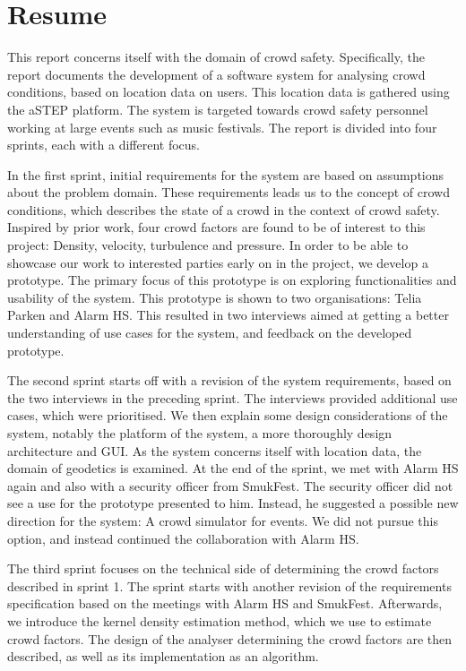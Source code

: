 \chapter*{Resume}

This report concerns itself with the domain of crowd safety. Specifically, the report documents the development of a software system for analysing crowd conditions, based on location data on users. This location data is gathered using the aSTEP platform. The system is targeted towards crowd safety personnel working at large events such as music festivals. The report is divided into four sprints, each with a different focus.

In the first sprint, initial requirements for the system are based on assumptions about the problem domain. These requirements leads us to the concept of crowd conditions, which describes the state of a crowd in the context of crowd safety. Inspired by prior work, four crowd factors are found to be of interest to this project: Density, velocity, turbulence and pressure. In order to be able to showcase our work to interested parties early on in the project, we develop a prototype. The primary focus of this prototype is on exploring functionalities and usability of the system. This prototype is shown to two organisations: Telia Parken and Alarm HS. This resulted in two interviews aimed at getting a better understanding of use cases for the system, and feedback on the developed prototype.

The second sprint starts off with a revision of the system requirements, based on the two interviews in the preceding sprint. The interviews provided additional use cases, which were prioritised. We then explain some design considerations of the system, notably the platform of the system, a more thoroughly design architecture and GUI. As the system concerns itself with location data, the domain of geodetics is examined. At the end of the sprint, we met with Alarm HS again and also with a security officer from SmukFest. The security officer did not see a use for the prototype presented to him. Instead, he suggested a possible new direction for the system: A crowd simulator for events. We did not pursue this option, and instead continued the collaboration with Alarm HS.

The third sprint focuses on the technical side of determining the crowd factors described in sprint 1. The sprint starts with another revision of the requirements specification based on the meetings with Alarm HS and SmukFest. Afterwards, we introduce the kernel density estimation method, which we use to estimate crowd factors. The design of the analyser determining the crowd factors are then described, as well as its implementation as an algorithm.

